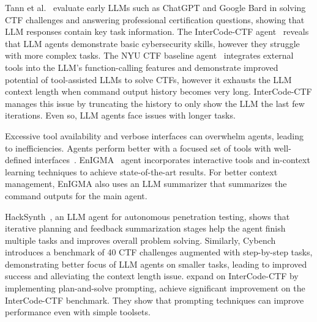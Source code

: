 Tann et al.~\cite{tann2023using} evaluate early LLMs such as ChatGPT and Google Bard in solving CTF challenges and answering professional certification questions, showing that LLM responses contain key task information.
The InterCode-CTF agent~\cite{yang2023intercode} reveals that LLM agents demonstrate basic cybersecurity skills, however they struggle with more complex tasks.
The NYU CTF baseline agent~\cite{shao2024empirical} integrates external tools into the LLM's function-calling features and demonstrate improved potential of tool-assisted LLMs to solve CTFs, however it exhausts the LLM context length when command output history becomes very long. InterCode-CTF manages this issue by truncating the history to only show the LLM the last few iterations. Even so, LLM agents face issues with longer tasks.


Excessive tool availability and verbose interfaces can overwhelm agents, leading to inefficiencies. Agents perform better with a focused set of tools with well-defined interfaces~\cite{yang2024sweagent}.
EnIGMA~\cite{abramovich2024enigma} agent incorporates interactive tools and in-context learning techniques to achieve state-of-the-art results. %
For better context management, EnIGMA also uses an LLM summarizer that summarizes the command outputs for the main agent.

HackSynth~\cite{muzsai2024hacksynth}, an LLM agent for autonomous penetration testing, shows that iterative planning and feedback summarization stages help the agent finish multiple tasks and improves overall problem solving.
Similarly, Cybench~\cite{zhang2024cybenchframeworkevaluatingcybersecurity} introduces a benchmark of 40 CTF challenges augmented with step-by-step tasks, demonstrating better focus of LLM agents on smaller tasks, leading to improved success and alleviating the context length issue.
\citet{turtayev2024hacking} expand on InterCode-CTF by implementing plan-and-solve prompting, achieve significant improvement on the InterCode-CTF benchmark. They show that prompting techniques can improve performance even with simple toolsets.

